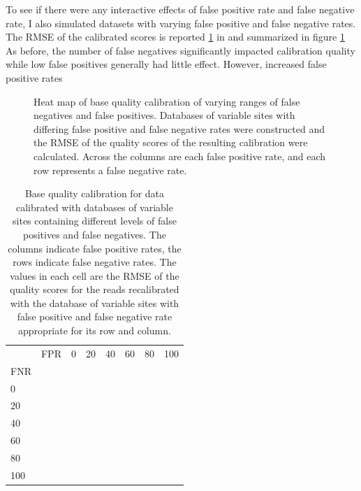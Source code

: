 \documentclass{article}
\begin{document}
\begin{outline}
	\item To see if there were any interactive effects of false positive rate and false negative rate, I also simulated datasets with varying false positive and false negative rates. The RMSE of the calibrated scores is reported \ref{table:fprfnr} in and summarized in figure \ref{figure:fprfnr} 
	As before, the number of false negatives significantly impacted calibration quality while low false positives generally had little effect. However, increased false positive rates  %
\end{outline}

\begin{figure}
	\caption{Heat map of base quality calibration of varying ranges of false negatives and false positives. Databases of variable sites with differing false positive and false negative rates were constructed and the RMSE of the quality scores of the resulting calibration were calculated. Across the columns are each false positive rate, and each row represents a false negative rate.}
	\label{figure:fprfnr}
\end{figure}

\begin{table}
\begin{tabularx}{.5\textwidth}{| l l | X  X  X  X  X  X |}
\hline
& FPR& 0 & 20 & 40 & 60 & 80 & 100 \\
FNR &&   &    &    &    &    & \\ %
\hline
0   &&  &  &  &  &  & \\
20  &&  &  &  &  &  & \\
40  &&  &  &  &  &  & \\
60  &&  &  &  &  &  & \\
80  &&  &  &  &  &  & \\
100 &&  &  &  &  &  & \\
\hline
\end{tabularx}
\caption{Base quality calibration for data calibrated with databases of variable sites containing different levels of false positives and false negatives. The columns indicate false positive rates, the rows indicate false negative rates. The values in each cell are the RMSE of the quality scores for the reads recalibrated with the database of variable sites with false positive and false negative rate appropriate for its row and column.}
\label{table:fprfnr}
\end{table}
\end{document}
